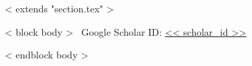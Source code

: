 ~< extends "section.tex" >~

~< block body >~
\vspace{-7.5mm}
\hfill
Google Scholar ID:
\href{https://scholar.google.com/citations?user=<< scholar_id >>}{<< scholar_id >>}
\vspace{2mm}

\renewcommand*{\bibfont}{\small}

\begin{refsection}
\nocite{*}
\printbibliography[heading=none,prefixnumbers=,type=article]
\end{refsection}

~< endblock body >~
